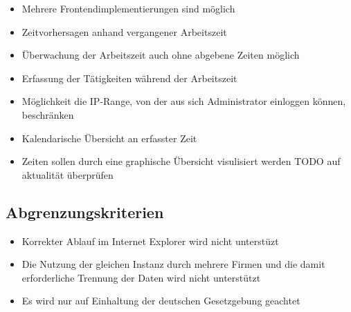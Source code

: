\begin{itemize}
	\item Mehrere Frontendimplementierungen sind möglich
	\item Zeitvorhersagen anhand vergangener Arbeitszeit
	\item Überwachung der Arbeitszeit auch ohne abgebene Zeiten möglich
	\item Erfassung der Tätigkeiten während der Arbeitszeit
	\item Möglichkeit die IP-Range, von der aus sich Administrator einloggen können, beschränken
	\item Kalendarische Übersicht an erfasster Zeit
	\item Zeiten sollen durch eine graphische Übersicht visulisiert werden TODO auf aktualität überprüfen
\end{itemize}


\subsection{Abgrenzungskriterien}
\begin{itemize}
	\item Korrekter Ablauf im Internet Explorer wird nicht unterstüzt
	\item Die Nutzung der gleichen Instanz durch mehrere Firmen und die damit erforderliche Trennung der Daten wird nicht unterstützt
	\item Es wird nur auf Einhaltung der deutschen Gesetzgebung geachtet
\end{itemize}
